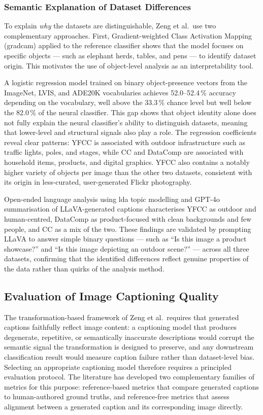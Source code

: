 \subsubsection*{Semantic Explanation of Dataset Differences}

To explain \emph{why} the datasets are distinguishable, Zeng et al.\ use two complementary
approaches. First, Gradient-weighted Class Activation Mapping (\acrshort{gradcam}) applied
to the reference classifier shows that the model focuses on specific objects --- such as
elephant herds, tables, and pens --- to identify dataset origin. This motivates the use of
object-level analysis as an interpretability tool.

A logistic regression model trained on binary object-presence vectors from the ImageNet,
LVIS, and ADE20K vocabularies achieves 52.0--52.4\,\% accuracy depending on the vocabulary,
well above the 33.3\,\% chance level but well below the 82.0\,\% of the neural classifier.
This gap shows that object identity alone does not fully explain the neural classifier's
ability to distinguish datasets, meaning that lower-level and structural signals also play a
role. The regression coefficients reveal clear patterns: YFCC is associated with outdoor
infrastructure such as traffic lights, poles, and stages, while CC and DataComp are
associated with household items, products, and digital graphics. YFCC also contains a
notably higher variety of objects per image than the other two datasets, consistent with its
origin in less-curated, user-generated Flickr photography.

Open-ended language analysis using \acrshort{lda} topic modelling and GPT-4o summarisation
of LLaVA-generated captions characterises YFCC as outdoor and human-centred, DataComp as
product-focused with clean backgrounds and few people, and CC as a mix of the two. These
findings are validated by prompting LLaVA to answer simple binary questions --- such as
``Is this image a product showcase?'' and ``Is this image depicting an outdoor scene?'' ---
across all three datasets, confirming that the identified differences reflect genuine
properties of the data rather than quirks of the analysis method.


\subsection*{Evaluation of Image Captioning Quality}

The transformation-based framework of Zeng et al.\ requires that 
generated captions faithfully reflect image content: a captioning 
model that produces degenerate, repetitive, or semantically 
inaccurate descriptions would corrupt the semantic signal the 
transformation is designed to preserve, and any downstream 
classification result would measure caption failure rather than 
dataset-level bias. Selecting an appropriate captioning model 
therefore requires a principled evaluation protocol. The literature 
has developed two complementary families of metrics for this 
purpose: reference-based metrics that compare generated captions 
to human-authored ground truths, and reference-free metrics that 
assess alignment between a generated caption and its corresponding 
image directly.

